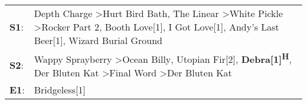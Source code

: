 \begin{supertabular}{p{0.03\textwidth}p{0.92\textwidth}}
 \textbf{S1}:  &  Depth Charge\textsuperscript{} \textgreater \enspace Hurt Bird Bath\textsuperscript{}, \enspace The Linear\textsuperscript{} \textgreater \enspace White Pickle\textsuperscript{} \textgreater \enspace Rocker Part 2\textsuperscript{}, \enspace Booth Love[1]\textsuperscript{}, \enspace I Got Love[1]\textsuperscript{}, \enspace Andy's Last Beer[1]\textsuperscript{}, \enspace Wizard Burial Ground\textsuperscript{}  \enspace  \\
 \textbf{S2}:  &                                                                                         Wappy Sprayberry\textsuperscript{} \textgreater \enspace Ocean Billy\textsuperscript{}, \enspace Utopian Fir[2]\textsuperscript{}, \enspace \textbf{Debra[1]\textsuperscript{H}}, \enspace Der Bluten Kat\textsuperscript{} \textgreater \enspace Final Word\textsuperscript{} \textgreater \enspace Der Bluten Kat\textsuperscript{}  \enspace  \\
 \textbf{E1}:  &                                                                                                                                                                                                                                                                                                                                                                                               Bridgeless[1]\textsuperscript{}  \enspace  \\
\end{supertabular}

